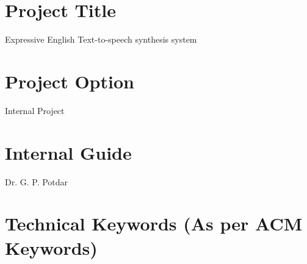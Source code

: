 \documentclass[oneside,a4paper,12pt]{book}
\begin{document}
\section{Project Title}
Expressive English Text-to-speech synthesis system

\section{ Project Option }
Internal Project

\section{Internal Guide}
Dr. G. P. Potdar


\section{Technical Keywords (As per ACM Keywords)}
\end{document}
